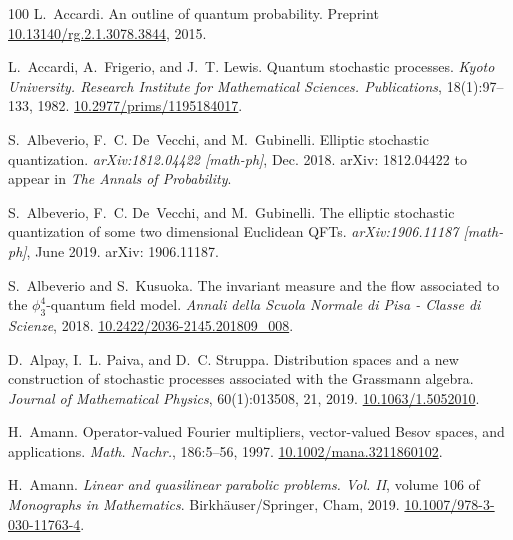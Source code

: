 \documentclass[11pt]{article}
\newcommand{\tmem}[1]{{\em #1\/}}
\newcommand{\tmtextit}[1]{{\itshape{#1}}}
\begin{document}
\begin{thebibliography}{100}
  L.~Accardi. {\newblock}An outline of
  quantum probability. {\newblock}Preprint
  \href{https://doi.org/10.13140/rg.2.1.3078.3844}{10.13140/rg.2.1.3078.3844},
  2015.
  
  L.~Accardi, A.~Frigerio, and J.~T. Lewis.
  {\newblock}Quantum stochastic processes. {\newblock}\tmtextit{Kyoto
  University. Research Institute for Mathematical Sciences. Publications},
  18(1):97--133, 1982. {\newblock}
  \href{https://doi.org/10.2977/prims/1195184017}{10.2977/prims/1195184017}.
  
  S.~Albeverio, F.~C. De~Vecchi, and
  M.~Gubinelli. {\newblock}Elliptic stochastic quantization.
  {\newblock}\tmtextit{arXiv:1812.04422 [math-ph]}, Dec. 2018.
  {\newblock}arXiv: 1812.04422 to appear in {\tmem{The Annals of
  Probability}}.
  
  S.~Albeverio, F.~C. De~Vecchi, and
  M.~Gubinelli. {\newblock}The elliptic stochastic quantization of some two
  dimensional Euclidean QFTs. {\newblock}\tmtextit{arXiv:1906.11187
  [math-ph]}, June 2019. {\newblock}arXiv: 1906.11187.
  
  S.~Albeverio and S.~Kusuoka.
  {\newblock}The invariant measure and the flow associated to the
  $\phi^4_3$-quantum field model. {\newblock}\tmtextit{Annali della Scuola
  Normale di Pisa - Classe di Scienze}, 2018. {\newblock}
  \href{https://doi.org/10.2422/2036-2145.201809_008}{10.2422/2036-2145.201809\_008}.
  
  D.~Alpay, I.~L. Paiva, and D.~C.
  Struppa. {\newblock}Distribution spaces and a new construction of stochastic
  processes associated with the Grassmann algebra.
  {\newblock}\tmtextit{Journal of Mathematical Physics}, 60(1):013508, 21,
  2019.
  {\newblock}\href{https://doi.org/10.1063/1.5052010}{10.1063/1.5052010}.
  
  H.~Amann. {\newblock}Operator-valued Fourier
  multipliers, vector-valued Besov spaces, and applications.
  {\newblock}\tmtextit{Math. Nachr.}, 186:5--56, 1997. {\newblock}
  \href{https://doi.org/10.1002/mana.3211860102}{10.1002/mana.3211860102}.
  
  H.~Amann. {\newblock}\tmtextit{Linear and quasilinear
  parabolic problems. Vol. II}, volume 106 of \tmtextit{Monographs in
  Mathematics}. {\newblock}Birkh{\"a}user/Springer, Cham, 2019. {\newblock}
  \href{https://doi.org/10.1007/978-3-030-11763-4}{10.1007/978-3-030-11763-4}.
  

\end{thebibliography}
\end{document}
